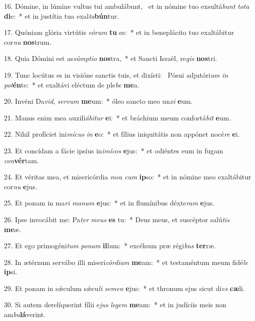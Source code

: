 16. Dómine, in lúmine vultus tui ambulábunt, \dag\  et in nómine tuo exsultá\textit{bunt} \textit{to}\textit{ta} \textbf{di}e:~*  et in justítia tua exal\textit{ta}\textbf{bún}tur.\

17. Quóniam glória virtútis \textit{e}\textit{ó}\textit{rum} \textbf{tu} es:~*  et in beneplácito tuo exaltábitur cor\textit{nu} \textbf{nos}trum.\

18. Quia Dómini est as\textit{súmp}\textit{ti}\textit{o} \textbf{nos}tra,~*  et Sancti Israël, re\textit{gis} \textbf{nos}tri.\

19. Tunc locútus es in visióne sanctis tuis, et dixísti: \dag\  Pósui adjutóri\textit{um} \textit{in} \textit{pot}\textbf{én}te:~*  et exaltávi eléctum de ple\textit{be} \textbf{me}a.\

20. Invéni Da\textit{vid}, \textit{ser}\textit{vum} \textbf{me}um:~*  óleo sancto meo un\textit{xi} \textbf{e}um.\

21. Manus enim mea auxili\textit{á}\textit{bi}\textit{tur} \textbf{e}i:~*  et bráchium meum confortá\textit{bit} \textbf{e}um.\

22. Nihil profíciet ini\textit{mí}\textit{cus} \textit{in} \textbf{e}o:~*  et fílius iniquitátis non appónet nocé\textit{re} \textbf{e}i.\

23. Et concídam a fácie ipsíus in\textit{i}\textit{mí}\textit{cos} \textbf{e}jus:~*  et odiéntes eum in fugam \textit{con}\textbf{vér}tam.\

24. Et véritas mea, et misericórdia \textit{me}\textit{a} \textit{cum} \textbf{ip}so:~*  et in nómine meo exaltábitur cor\textit{nu} \textbf{e}jus.\

25. Et ponam in ma\textit{ri} \textit{ma}\textit{num} \textbf{e}jus:~*  et in flumínibus déxte\textit{ram} \textbf{e}jus.\

26. Ipse invocábit me: Pa\textit{ter} \textit{me}\textit{us} \textbf{es} tu:~*  Deus meus, et suscéptor salú\textit{tis} \textbf{me}æ.\

27. Et ego primogéni\textit{tum} \textit{po}\textit{nam} \textbf{il}lum:~*  excélsum præ régi\textit{bus} \textbf{ter}ræ.\

28. In ætérnum servábo illi miseri\textit{cór}\textit{di}\textit{am} \textbf{me}am:~*  et testaméntum meum fidé\textit{le} \textbf{ip}si.\

29. Et ponam in sǽculum sǽcu\textit{li} \textit{se}\textit{men} \textbf{e}jus:~*  et thronum ejus sicut di\textit{es} \textbf{cæ}li.\

30. Si autem derelíquerint fílii e\textit{jus} \textit{le}\textit{gem} \textbf{me}am:~*  et in judíciis meis non am\textit{bu}\textbf{lá}verint.\

